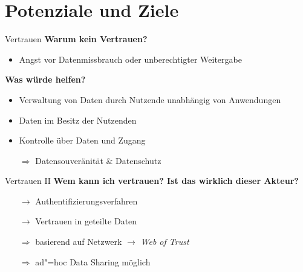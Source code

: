 
\section{Potenziale und Ziele}

\begin{frame}{Vertrauen}
    \textbf{Warum kein Vertrauen?}
    \begin{itemize}
        \item Angst vor Datenmissbrauch oder unberechtigter Weitergabe~\cite{mollerIndustrialDataEcosystems2024}
    \end{itemize}

    \pause
    \textbf{Was würde helfen?}
    \begin{itemize}
        \item Verwaltung von Daten durch Nutzende unabhängig von Anwendungen
        \item Daten im Besitz der Nutzenden
        \item Kontrolle über Daten und Zugang

        \pause
        \item[$\Rightarrow$] Datensouveränität \& Datenschutz
    \end{itemize}
\end{frame}

\begin{frame}{Vertrauen II}
    \textbf{Wem kann ich vertrauen? Ist das wirklich dieser Akteur?}
    \begin{itemize}
        \item[$\to$] Authentifizierungsverfahren
        \item[$\to$] Vertrauen in geteilte Daten

        \pause
        \item[$\Rightarrow$] basierend auf Netzwerk $\to$ \emph{Web of Trust}
        \item[$\Rightarrow$] ad"=hoc Data Sharing möglich
    \end{itemize}
\end{frame}

